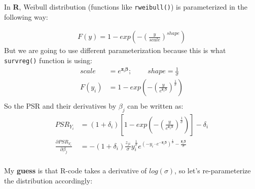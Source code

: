 \documentclass[]{article}
\begin{document}
In \textbf{R}, Weibull distribution (functions like \texttt{rweibull()}) is parameterized in the following way:

  $$
  \begin{aligned}
    F(y)  = 1-exp\left(-\left(\frac{y}{scale}\right)^{shape}\right)
  \end{aligned}
  $$
But we are going to use different parameterization because this is what \texttt{survreg()} function is using:
  $$
  \begin{aligned}
    scale &= e^{\pmb{z}_i\pmb{\beta}};~~~~~~~~~~shape =\frac{1}{\sigma}\\
    F(y_i)  &= 1-exp\left(-\left(\frac{y}{e^{\pmb{z}_i\pmb{\beta}}}\right)^{\frac{1}{\sigma}}\right)\\
  \end{aligned}
  $$
So the PSR and their derivatives by $\beta_j$ can be written as:
  $$
  \begin{aligned}
    PSR_{Y_i} &=  (1+\delta_i) \left[  1-exp\left(-\left(\frac{y}{e^{\pmb{z}_i\pmb{\beta}}}\right)^{\frac{1}{\sigma}}\right)    \right]  -  \delta_i\\
    \frac{\partial PSR_{Y_i}}{\partial \beta_j} &= -(1+\delta_i)\frac{z_{ji}}{\sigma}  y_i^{\frac{1}{\sigma}} e^{ \left( - y_i\cdot e^{-\pmb{z}_i\pmb{\beta}} \right)^{\frac{1}{\sigma}}  - \frac{\pmb{z}_i\pmb{\beta}}{\sigma} } \\
  \end{aligned}
  $$

My \textbf{guess} is that R-code takes a derivative of $log(\sigma)$, so let's re-parameterize the distribution accordingly: 
\end{document}
